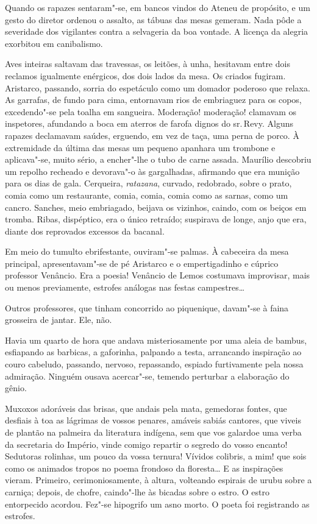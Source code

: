 Quando os rapazes sentaram"-se, em bancos vindos do Ateneu
de propósito, e um gesto do diretor ordenou o assalto, as tábuas das
mesas gemeram. Nada pôde a severidade dos vigilantes contra a
selvageria da boa vontade. A licença da alegria exorbitou em
canibalismo. 

Aves inteiras saltavam das travessas, os leitões, à unha,
hesitavam entre dois reclamos igualmente enérgicos, dos dois lados da
mesa. Os criados fugiram. Aristarco, passando, sorria do espetáculo
como um domador poderoso que relaxa. As garrafas, de fundo para cima,
entornavam rios de embriaguez para os copos, excedendo"-se pela toalha
em sangueira. Moderação! moderação! clamavam os inspetores, afundando a
boca em aterros de farofa dignos do sr.\,Revy. Alguns rapazes declamavam
saúdes, erguendo, em vez de taça, uma perna de porco. À extremidade da
última das mesas um pequeno apanhara um trombone e aplicava"-se, muito
sério, a encher"-lhe o tubo de carne assada. Maurílio descobriu um
repolho recheado e devorava"-o às gargalhadas, afirmando que era
munição para os dias de gala. Cerqueira, \textit{ratazana}, curvado, redobrado,
sobre o prato, comia como um restaurante, comia, comia, comia como as
sarnas, como um cancro. Sanches, meio embriagado, beijava os vizinhos,
caindo, com os beiços em tromba. Ribas, dispéptico, era o único
retraído; suspirava de longe, anjo que era, diante dos reprovados
excessos da bacanal. 

Em meio do tumulto ebrifestante, ouviram"-se
palmas. À cabeceira da mesa principal, apresentavam"-se de pé Aristarco e
o empertigadinho e cúprico professor Venâncio. Era a poesia! Venâncio
de Lemos costumava improvisar, mais ou menos previamente, estrofes
análogas nas festas campestres\ldots{} 

Outros professores, que tinham concorrido ao piquenique, 
davam"-se à faina grosseira de jantar. Ele, não. 

Havia um quarto de hora que andava misteriosamente por uma aleia
de bambus, esfiapando as barbicas, a gaforinha, palpando a testa,
arrancando inspiração ao couro cabeludo, passando, nervoso, repassando,
espiado furtivamente pela nossa admiração. Ninguém ousava acercar"-se,
temendo perturbar a elaboração do gênio. 

Muxoxos adoráveis das brisas,
que andais pela mata, gemedoras fontes, que desfiais à toa as lágrimas
de vossos penares, amáveis sabiás cantores, que viveis de plantão na
palmeira da literatura indígena, sem que vos galardoe uma verba da
secretaria do Império, vinde comigo repartir o segredo do vosso
encanto! Sedutoras rolinhas, um pouco da vossa ternura! Vívidos
colibris, a mim! que sois como os animados tropos no poema frondoso da
floresta\ldots{} E as inspirações vieram. Primeiro, cerimoniosamente, à
altura, volteando espirais de urubu sobre a carniça; depois, de chofre,
caindo"-lhe às bicadas sobre o estro. O estro entorpecido acordou.
Fez"-se hipogrifo um asno morto. O poeta foi registrando as estrofes.

